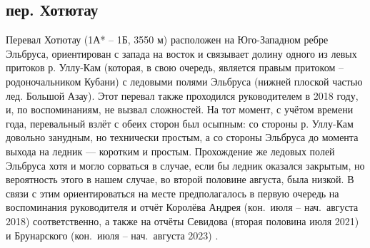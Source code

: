 \subsection{пер. Хотютау} 
Перевал Хотютау (1А* -- 1Б, 3550 м) расположен на Юго-Западном ребре Эльбруса, ориентирован с запада на восток и связывает долину одного из левых притоков р. Уллу-Кам (которая, в свою очередь, является правым притоком -- родоночальником Кубани) с ледовыми полями Эльбруса (нижней плоской частью лед. Большой Азау). Этот перевал также проходился руководителем в 2018 году, и, по воспоминаниям, не вызвал сложностей. На тот момент, с учётом времени года, перевальный взлёт с обеих сторон был осыпным: со стороны р. Уллу-Кам довольно занудным, но технически простым, а со стороны Эльбруса до момента выхода на ледник --- коротким и простым. Прохождение же ледовых полей Эльбруса хотя и могло сорваться в случае, если бы ледник оказался закрытым, но вероятность этого в нашем случае, во второй половине августа, была низкой. В связи с этим ориентироваться на месте предполагалось в первую очередь на воспоминания руководителя и отчёт Королёва Андрея (кон.~июля -- нач.~августа 2018) \cite{Korolyov2018} соответственно, а также на отчёты Севидова (вторая половина июля 2021) \cite{Sevidov2021} и Брунарского (кон.~июля -- нач.~августа 2023) \cite{Brunarsky2023}.